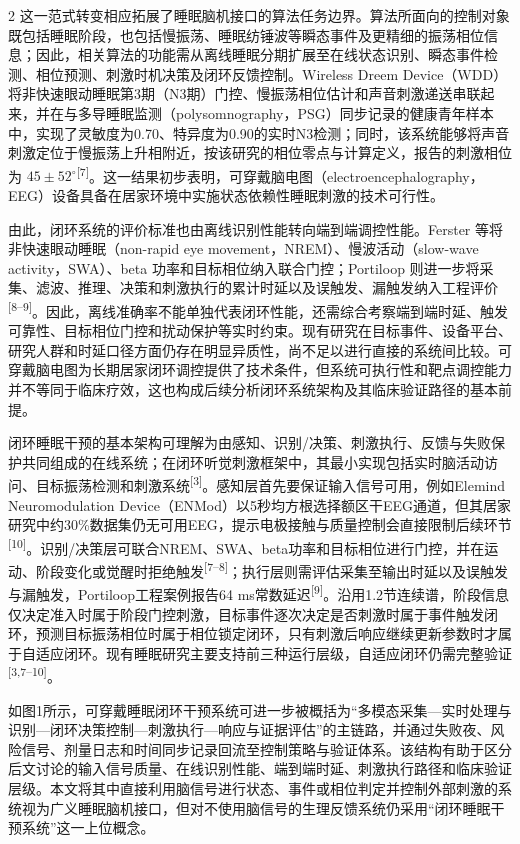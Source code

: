 \documentclass[UTF8,zihao=5,fontset=none]{ctexart}
\newcommand{\hei}{\CJKfamily{hei}}
\newcommand{\leveltwo}[1]{%
  \par\noindent{\hei\fontsize{10.5pt}{12.6pt}\selectfont\mdseries #1\par}}
\newcommand{\refcite}[1]{\nolinebreak[4]\textsuperscript{[#1]}}
\begin{document}
\begin{multicols}{2}
这一范式转变相应拓展了睡眠脑机接口的算法任务边界。算法所面向的控制对象既包括睡眠阶段，也包括慢振荡、睡眠纺锤波等瞬态事件及更精细的振荡相位信息；因此，相关算法的功能需从离线睡眠分期扩展至在线状态识别、瞬态事件检测、相位预测、刺激时机决策及闭环反馈控制。Wireless Dreem Device（WDD）将非快速眼动睡眠第3期（N3期）门控、慢振荡相位估计和声音刺激递送串联起来，并在与多导睡眠监测（polysomnography，PSG）同步记录的健康青年样本中，实现了灵敏度为0.70、特异度为0.90的实时N3检测；同时，该系统能够将声音刺激定位于慢振荡上升相附近，按该研究的相位零点与计算定义，报告的刺激相位为 $45\pm52^{\circ}$\refcite{7}。这一结果初步表明，可穿戴脑电图（electroencephalography，EEG）设备具备在居家环境中实施状态依赖性睡眠刺激的技术可行性。

由此，闭环系统的评价标准也由离线识别性能转向端到端调控性能。Ferster 等将非快速眼动睡眠（non-rapid eye movement，NREM）、慢波活动（slow-wave activity，SWA）、beta 功率和目标相位纳入联合门控；Portiloop 则进一步将采集、滤波、推理、决策和刺激执行的累计时延以及误触发、漏触发纳入工程评价\refcite{8--9}。因此，离线准确率不能单独代表闭环性能，还需综合考察端到端时延、触发可靠性、目标相位门控和扰动保护等实时约束。现有研究在目标事件、设备平台、研究人群和时延口径方面仍存在明显异质性，尚不足以进行直接的系统间比较。可穿戴脑电图为长期居家闭环调控提供了技术条件，但系统可执行性和靶点调控能力并不等同于临床疗效，这也构成后续分析闭环系统架构及其临床验证路径的基本前提。

\leveltwo{1.3 闭环睡眠干预系统的基本架构}

闭环睡眠干预的基本架构可理解为由感知、识别/决策、刺激执行、反馈与失败保护共同组成的在线系统；在闭环听觉刺激框架中，其最小实现包括实时脑活动访问、目标振荡检测和刺激系统\refcite{3}。感知层首先要保证输入信号可用，例如Elemind Neuromodulation Device（ENMod）以5秒均方根选择额区干EEG通道，但其居家研究中约30\%数据集仍无可用EEG，提示电极接触与质量控制会直接限制后续环节\refcite{10}。识别/决策层可联合NREM、SWA、beta功率和目标相位进行门控，并在运动、阶段变化或觉醒时拒绝触发\refcite{7--8}；执行层则需评估采集至输出时延以及误触发与漏触发，Portiloop工程案例报告64 ms常数延迟\refcite{9}。沿用1.2节连续谱，阶段信息仅决定准入时属于阶段门控刺激，目标事件逐次决定是否刺激时属于事件触发闭环，预测目标振荡相位时属于相位锁定闭环，只有刺激后响应继续更新参数时才属于自适应闭环。现有睡眠研究主要支持前三种运行层级，自适应闭环仍需完整验证\refcite{3,7--10}。

如图1所示，可穿戴睡眠闭环干预系统可进一步被概括为“多模态采集—实时处理与识别—闭环决策控制—刺激执行—响应与证据评估”的主链路，并通过失败夜、风险信号、剂量日志和时间同步记录回流至控制策略与验证体系。该结构有助于区分后文讨论的输入信号质量、在线识别性能、端到端时延、刺激执行路径和临床验证层级。本文将其中直接利用脑信号进行状态、事件或相位判定并控制外部刺激的系统视为广义睡眠脑机接口，但对不使用脑信号的生理反馈系统仍采用“闭环睡眠干预系统”这一上位概念。\par


\end{multicols}
\end{document}
